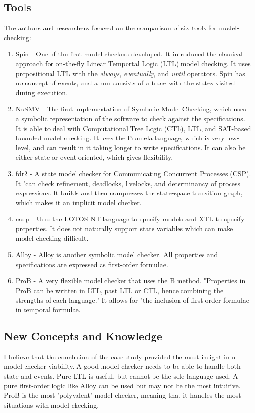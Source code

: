 \documentclass[conference]{IEEEtran}
\begin{document}
\subsection{Tools}
The authors and researchers focused on the comparison of six tools for model-checking:
\begin{enumerate}

\item Spin - One of the first model checkers developed. It introduced the classical approach for on-the-fly Linear Temportal Logic (LTL) model checking. It uses propositional LTL with the \emph{always}, \emph{eventually}, and \emph{until} operators. Spin has no concept of events, and a run consists of a trace with the states visited during execution.

\item NuSMV - The first implementation of Symbolic Model Checking, which uses a symbolic representation of the software to check against the specifications. It is able to deal with Computational Tree Logic (CTL), LTL, and SAT-based bounded model checking. It uses the Promela language, which is very low-level, and can result in it taking longer to write specifications. It can also be either state or event oriented, which gives flexibility.

\item fdr2 - A state model checker for Communicating Concurrent Processes (CSP). It "can check refinement, deadlocks, livelocks, and determinancy of process expressions. It builds and then compresses the state-space transition graph, which makes it an implicit model checker.

\item cadp - Uses the LOTOS NT language to specify models and XTL to specify properties. It does not naturally support state variables which can make model checking difficult.

\item Alloy - Alloy is another symbolic model checker. All properties and specifications are expressed as first-order formulae.

\item ProB - A very flexible model checker that uses the B method. "Properties in ProB can be written in LTL, past LTL or CTL, hence combining the strengths of each language." It allows for "the inclusion of first-order formulae in temporal formulae.

\end{enumerate}

\subsection{New Concepts and Knowledge}
I believe that the conclusion of the case study provided the most insight into model checker viability. A good model checker needs to be able to handle both state and events. Pure LTL is useful, but cannot be the sole language used. A pure first-order logic like Alloy can be used but may not be the most intuitive. ProB is the most 'polyvalent' model checker, meaning that it handles the most situations with model checking.
\end{document}
